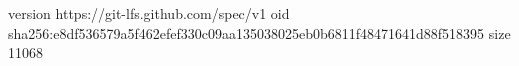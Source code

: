 version https://git-lfs.github.com/spec/v1
oid sha256:e8df536579a5f462efef330c09aa135038025eb0b6811f48471641d88f518395
size 11068
